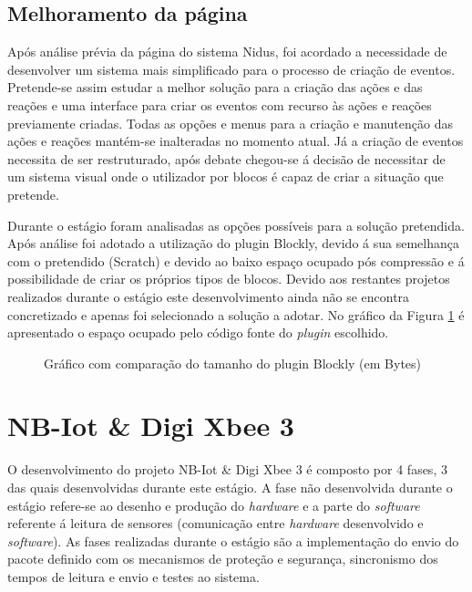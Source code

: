 \subsection{Melhoramento da página}
\par Após análise prévia da página do sistema Nidus, foi acordado a necessidade de desenvolver um sistema mais simplificado para o processo de criação de eventos. Pretende-se assim estudar a melhor solução para a criação das ações e das reações e uma interface para criar os eventos com recurso às ações e reações previamente criadas. Todas as opções e menus para a criação e manutenção das ações e reações mantém-se inalteradas no momento atual. Já a criação de eventos necessita de ser restruturado, após debate chegou-se á decisão de necessitar de um sistema visual onde o utilizador por blocos é capaz de criar a situação que pretende.
\par Durante o estágio foram analisadas as opções possíveis para a solução pretendida. Após análise foi adotado a utilização do plugin Blockly\cite{blockly}, devido á sua semelhança com o pretendido (Scratch) e devido ao baixo espaço ocupado pós compressão e á possibilidade de criar os próprios tipos de blocos. Devido aos restantes projetos realizados durante o estágio este desenvolvimento ainda não se encontra concretizado e apenas foi selecionado a solução a adotar. No gráfico da Figura \ref{block} é apresentado o espaço ocupado pelo código fonte do \textit{plugin} escolhido.


\begin{figure}[ht]
\centering
{}

\caption{Gráfico com comparação do tamanho do plugin Blockly (em Bytes)}\label{block}


\end{figure}



\section {NB-Iot \& Digi Xbee 3 }
\par
O desenvolvimento do projeto NB-Iot \& Digi Xbee 3 é composto por 4 fases, 3 das quais desenvolvidas durante este estágio. A fase não desenvolvida durante o estágio refere-se ao desenho e produção do \textit{hardware} e a parte do \textit{software} referente á leitura de sensores (comunicação entre \textit{hardware} desenvolvido e \textit{software}). As fases realizadas durante o estágio são a implementação do envio do pacote definido com os mecanismos de proteção e segurança, sincronismo dos tempos de leitura e envio e testes ao sistema.

